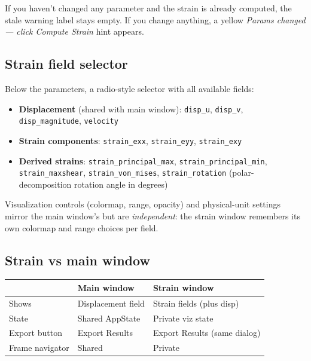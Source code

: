 If you haven't changed any parameter and the strain is already
computed, the stale warning label stays empty. If you change
anything, a yellow \emph{Params changed --- click Compute Strain}
hint appears.

\subsection{Strain field selector}

Below the parameters, a radio-style selector with all available
fields:

\begin{itemize}
  \item \textbf{Displacement} (shared with main window):
        \texttt{disp\_u}, \texttt{disp\_v}, \texttt{disp\_magnitude},
        \texttt{velocity}
  \item \textbf{Strain components}:
        \texttt{strain\_exx}, \texttt{strain\_eyy}, \texttt{strain\_exy}
  \item \textbf{Derived strains}:
        \texttt{strain\_principal\_max},
        \texttt{strain\_principal\_min},
        \texttt{strain\_maxshear},
        \texttt{strain\_von\_mises},
        \texttt{strain\_rotation} (polar-decomposition rotation
        angle in degrees)
\end{itemize}

Visualization controls (colormap, range, opacity) and physical-unit
settings mirror the main window's but are \emph{independent}: the
strain window remembers its own colormap and range choices per
field.

\subsection{Strain vs main window}

\begin{center}
\begin{tabular}{p{4cm}p{4cm}p{4cm}}
  \toprule
  & Main window & Strain window \\
  \midrule
  Shows & Displacement field & Strain fields (plus disp) \\
  State  & Shared AppState & Private viz state \\
  Export button & Export Results & Export Results (same dialog) \\
  Frame navigator & Shared & Private \\
  \bottomrule
\end{tabular}
\end{center}
